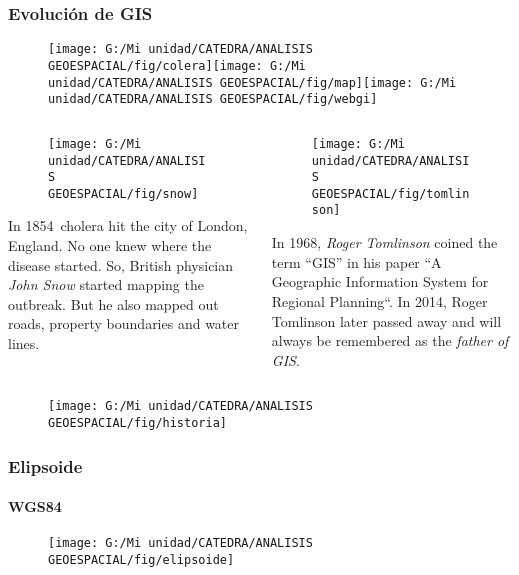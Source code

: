 \documentclass[14pt]{beamer}
\begin{document}
\begin{frame}\frametitle{Evolución de GIS}
\begin{figure}
\texttt{[image: G:/Mi unidad/CATEDRA/ANALISIS GEOESPACIAL/fig/colera]}\hfill\texttt{[image: G:/Mi unidad/CATEDRA/ANALISIS GEOESPACIAL/fig/map]}\hfill\texttt{[image: G:/Mi unidad/CATEDRA/ANALISIS GEOESPACIAL/fig/webgi]}
\end{figure}
	\begin{columns}
		\begin{column}{.48\linewidth}
			\begin{figure}
				\texttt{[image: G:/Mi unidad/CATEDRA/ANALISIS GEOESPACIAL/fig/snow]}\\
			\end{figure}
\scriptsize{In 1854\, cholera hit the city of London, England. No one knew where the disease started. So, British physician \emph{John Snow} started mapping the outbreak. But he also mapped out roads, property boundaries and water lines.}
		\end{column}
		\begin{column}{.48\linewidth}
			\begin{figure}
				\texttt{[image: G:/Mi unidad/CATEDRA/ANALISIS GEOESPACIAL/fig/tomlinson]}\\
			\end{figure}
\scriptsize{In 1968, \emph{Roger Tomlinson} coined the term “GIS” in his paper “A Geographic Information System for Regional Planning“. In 2014, Roger Tomlinson later passed away and will always be remembered as the \emph{father of GIS}.}
		\end{column}
	\end{columns}
\end{frame}
\begin{frame}
  \begin{figure}
    \centering
    \texttt{[image: G:/Mi unidad/CATEDRA/ANALISIS GEOESPACIAL/fig/historia]}
  \end{figure}
\end{frame}
\begin{frame}
\frametitle{Elipsoide}
\framesubtitle{WGS84}
  \begin{figure}
    \centering
    \texttt{[image: G:/Mi unidad/CATEDRA/ANALISIS GEOESPACIAL/fig/elipsoide]}
  \end{figure}
\end{frame}
\end{document}
